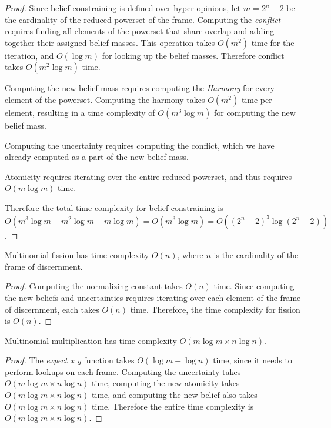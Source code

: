 \documentclass[thesis.tex]{subfiles}
\begin{document}
\begin{proof}
  Since belief constraining is defined over hyper opinions, let $m = 2^n - 2$ be the cardinality
  of the reduced powerset of the frame. Computing the \emph{conflict} requires finding all elements of
  the powerset that share overlap and adding together their assigned belief masses. This operation
  takes $O (m^2)$ time for the iteration, and $O (\log m)$ for looking up the belief masses. Therefore
  conflict takes $O (m^2 \log m)$ time.

  Computing the new belief mass requires computing the \emph{Harmony} for every element of the powerset.
  Computing the harmony takes $O (m^2)$ time per element, resulting in a time complexity of $O (m^3 \log m)$
  for computing the new belief mass.

  Computing the uncertainty requires computing the conflict, which we have already computed as a part of
  the new belief mass.

  Atomicity requires iterating over the entire reduced powerset, and thus requires $O (m \log m)$ time.

  Therefore the total time complexity for belief constraining is
  $O (m^3 \log m + m^2 \log m + m \log m) = O (m^3 \log m) = O ((2^n - 2)^3 \log (2^n - 2))$.
\end{proof}






\begin{theorem}
  Multinomial fission has time complexity $O (n)$, where $n$ is the cardinality of the frame of discernment.
\end{theorem}

\begin{proof}
  Computing the normalizing constant takes $O (n)$ time. Since computing the new beliefs and uncertainties
  requires iterating over each element of the frame of discernment, each takes $O (n)$ time. Therefore, the
  time complexity for fission is $O (n)$.
\end{proof}






\begin{theorem}
  Multinomial multiplication has time complexity $O (m \log m \times n \log n)$.
\end{theorem}

\begin{proof}
  The \emph{expect x y} function takes $O (\log m + \log n)$ time, since it needs to perform
  lookups on each frame. Computing the uncertainty takes $O (m \log m \times n \log n)$ time,
  computing the new atomicity takes $O (m \log m \times n \log n)$ time, and computing the new
  belief also takes $O (m \log m \times n \log n)$ time. Therefore the entire time complexity is
  $O (m \log m \times n \log n)$.
\end{proof}
\end{document}
